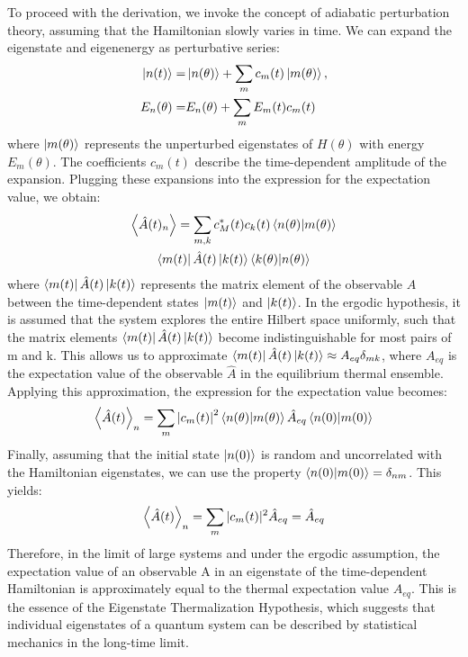 \documentclass[%
reprint,
superscriptaddress,
amsmath,amssymb,
aps,
prb,
]{revtex4-2}
\begin{document}
To proceed with the derivation, we invoke the concept of adiabatic perturbation theory, assuming that the Hamiltonian slowly varies in time. We can expand the eigenstate and eigenenergy as perturbative series:
\begin{align*}
\ket{n(t)} =& \ket{n(\theta)} + \sum_m c_m(t)\ket{m(\theta)},\\ 
E_n (\theta) =& E_n (\theta) + \sum_m E_m (t) c_m(t)
\end{align*}
where $\ket{m(\theta)}$ represents the unperturbed eigenstates of $H(\theta)$ with energy $E_m(\theta)$. The coefficients $c_m (t)$ describe the time-dependent amplitude of the expansion.
Plugging these expansions into the expression for the expectation value, we obtain:
\begin{multline}
	\expval{\hat{A}(t)_n} 
	= \sum_{m,k} c_M^\ast(t) c_k(t) \bra{n(\theta)}\ket{m(\theta)}\\
	\bra{m(t)}\hat{A}(t)
	\ket{k(t)} \bra{k(\theta)}\ket{n(\theta)}
\end{multline}
where $ \bra{m(t)}\hat{A}(t)\ket{k(t)}$ represents the matrix element of the observable $\hat{A}$ between the time-dependent states $\ket{m(t)}$ and $\ket{k(t)}$.
In the ergodic hypothesis, it is assumed that the system explores the entire Hilbert space uniformly, such that the matrix elements $\bra{m(t)}\hat{A}(t)\ket{k(t)}$ become indistinguishable for most pairs of m and k. This allows us to approximate $\bra{m(t)}\hat{A}(t)\ket{k(t)} \approx A_{eq} \delta_{mk}$, where $A_{eq}$ is the expectation value of the observable $\hat{A}$ in the equilibrium thermal ensemble.
Applying this approximation, the expression for the expectation value becomes:
\begin{equation*}
\expval{\hat{A}(t)}_n = \sum_m \abs{c_m(t)}^2 \bra{n(\theta)}\ket{m(\theta)} \hat{A}_{eq} \bra{n(0)}\ket{m(0)}
\end{equation*}
Finally, assuming that the initial state $\ket{n(0)}$ is random and uncorrelated with the Hamiltonian eigenstates, we can use the property $\bra{n(0)}\ket{m(0)}=\delta_{nm}$. This yields:
\begin{equation*}
\expval{\hat{A}(t)}_n = \sum_m |c_m(t)|^2 \hat{A}_{eq} = \hat{A}_{eq}
\end{equation*}
Therefore, in the limit of large systems and under the ergodic assumption, the expectation value of an observable A in an eigenstate of the time-dependent Hamiltonian is approximately equal to the thermal expectation value $A_{eq}$. This is the essence of the Eigenstate Thermalization Hypothesis, which suggests that individual eigenstates of a quantum system can be described by statistical mechanics in the long-time limit.
	
\end{document}
